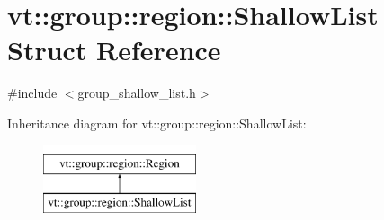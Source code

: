 \hypertarget{structvt_1_1group_1_1region_1_1_shallow_list}{}\section{vt\+:\+:group\+:\+:region\+:\+:Shallow\+List Struct Reference}
\label{structvt_1_1group_1_1region_1_1_shallow_list}


{\ttfamily \#include $<$group\+\_\+shallow\+\_\+list.\+h$>$}

Inheritance diagram for vt\+:\+:group\+:\+:region\+:\+:Shallow\+List\+:\begin{figure}[H]
\begin{center}
\leavevmode
\includegraphics[height=2.000000cm]{structvt_1_1group_1_1region_1_1_shallow_list}
\end{center}
\end{figure}
